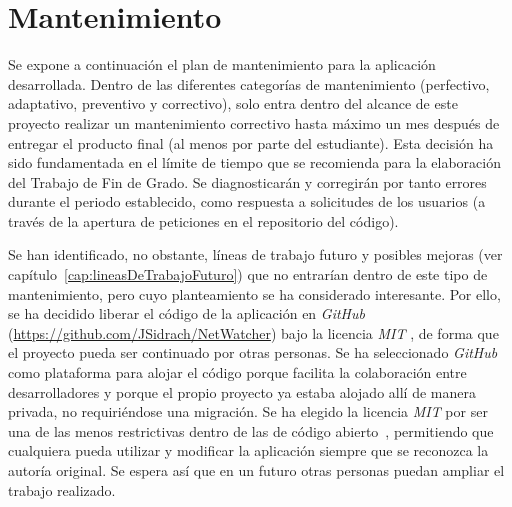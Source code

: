 \chapter{Mantenimiento\label{cap:mantenimiento}}

Se expone a continuación el plan de mantenimiento para la aplicación desarrollada.
Dentro de las diferentes categorías de mantenimiento (perfectivo, adaptativo, preventivo y correctivo), solo entra dentro del alcance de este proyecto realizar un mantenimiento correctivo hasta máximo un mes después de entregar el producto final (al menos por parte del estudiante).
Esta decisión ha sido fundamentada en el límite de tiempo que se recomienda para la elaboración del Trabajo de Fin de Grado.
Se diagnosticarán y corregirán por tanto errores durante el periodo establecido, como respuesta a solicitudes de los usuarios (a través de la apertura de peticiones en el repositorio del código).

Se han identificado, no obstante, líneas de trabajo futuro y posibles mejoras (ver capítulo~\ref{cap:lineasDeTrabajoFuturo}) que no entrarían dentro de este tipo de mantenimiento, pero cuyo planteamiento se ha considerado interesante.
Por ello, se ha decidido liberar el código de la aplicación en \textit{GitHub} (\url{https://github.com/JSidrach/NetWatcher}) bajo la licencia \textit{MIT} \cite{mit}, de forma que el proyecto pueda ser continuado por otras personas.
Se ha seleccionado \textit{GitHub} como plataforma para alojar el código porque facilita la colaboración entre desarrolladores y porque el propio proyecto ya estaba alojado allí de manera privada, no requiriéndose una migración.
Se ha elegido la licencia \textit{MIT} por ser una de las menos restrictivas dentro de las de código abierto~\cite{licenses}, permitiendo que cualquiera pueda utilizar y modificar la aplicación siempre que se reconozca la autoría original.
Se espera así que en un futuro otras personas puedan ampliar el trabajo realizado.
